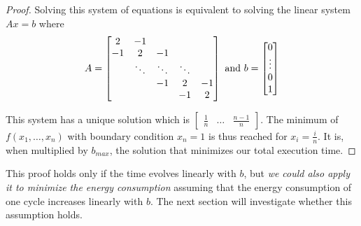 \begin{proof}
  
  Solving this system of equations is equivalent to solving the linear system $Ax=b$ where
  \[ A = \begin{bmatrix}
    2       & -1 &  &  &  \\
    -1       & 2 & -1 &  &  \\
    & \ddots & \ddots & \ddots & \\
    & & -1 & 2 & -1 \\
           &  &  & -1 & 2
\end{bmatrix} \textup{ and } b = \begin{bmatrix} 0 \\ \vdots \\ 0 \\ 1 \end{bmatrix} \]
   
   This system has a unique solution which is $\begin{bmatrix} \frac{1}{n} & \dots & \frac{n-1}{n} \end{bmatrix}$.
   The minimum of $f(x_1,\dots,x_n)$ with boundary condition $x_n=1$ is thus reached for $x_i = \frac{i}{n}$.
   It is, when multiplied by $b_{max}$, the solution that minimizes our total execution time.
   \end{proof}
   
   This proof holds only if the time evolves linearly with $b$, but \textit{we could also apply it to minimize the energy consumption} assuming that the energy consumption of one cycle increases linearly with $b$. The next section will investigate whether
   this assumption holds.